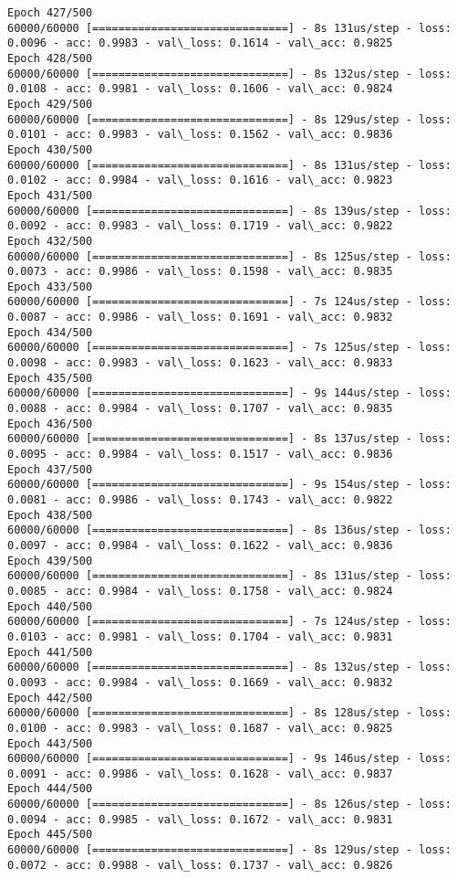 \documentclass[11pt]{article}
\begin{document}
\begin{Verbatim}[commandchars=\\\{\}]
Epoch 427/500
60000/60000 [==============================] - 8s 131us/step - loss: 0.0096 - acc: 0.9983 - val\_loss: 0.1614 - val\_acc: 0.9825
Epoch 428/500
60000/60000 [==============================] - 8s 132us/step - loss: 0.0108 - acc: 0.9981 - val\_loss: 0.1606 - val\_acc: 0.9824
Epoch 429/500
60000/60000 [==============================] - 8s 129us/step - loss: 0.0101 - acc: 0.9983 - val\_loss: 0.1562 - val\_acc: 0.9836
Epoch 430/500
60000/60000 [==============================] - 8s 131us/step - loss: 0.0102 - acc: 0.9984 - val\_loss: 0.1616 - val\_acc: 0.9823
Epoch 431/500
60000/60000 [==============================] - 8s 139us/step - loss: 0.0092 - acc: 0.9983 - val\_loss: 0.1719 - val\_acc: 0.9822
Epoch 432/500
60000/60000 [==============================] - 8s 125us/step - loss: 0.0073 - acc: 0.9986 - val\_loss: 0.1598 - val\_acc: 0.9835
Epoch 433/500
60000/60000 [==============================] - 7s 124us/step - loss: 0.0087 - acc: 0.9986 - val\_loss: 0.1691 - val\_acc: 0.9832
Epoch 434/500
60000/60000 [==============================] - 7s 125us/step - loss: 0.0098 - acc: 0.9983 - val\_loss: 0.1623 - val\_acc: 0.9833
Epoch 435/500
60000/60000 [==============================] - 9s 144us/step - loss: 0.0088 - acc: 0.9984 - val\_loss: 0.1707 - val\_acc: 0.9835
Epoch 436/500
60000/60000 [==============================] - 8s 137us/step - loss: 0.0095 - acc: 0.9984 - val\_loss: 0.1517 - val\_acc: 0.9836
Epoch 437/500
60000/60000 [==============================] - 9s 154us/step - loss: 0.0081 - acc: 0.9986 - val\_loss: 0.1743 - val\_acc: 0.9822
Epoch 438/500
60000/60000 [==============================] - 8s 136us/step - loss: 0.0097 - acc: 0.9984 - val\_loss: 0.1622 - val\_acc: 0.9836
Epoch 439/500
60000/60000 [==============================] - 8s 131us/step - loss: 0.0085 - acc: 0.9984 - val\_loss: 0.1758 - val\_acc: 0.9824
Epoch 440/500
60000/60000 [==============================] - 7s 124us/step - loss: 0.0103 - acc: 0.9981 - val\_loss: 0.1704 - val\_acc: 0.9831
Epoch 441/500
60000/60000 [==============================] - 8s 132us/step - loss: 0.0093 - acc: 0.9984 - val\_loss: 0.1669 - val\_acc: 0.9832
Epoch 442/500
60000/60000 [==============================] - 8s 128us/step - loss: 0.0100 - acc: 0.9983 - val\_loss: 0.1687 - val\_acc: 0.9825
Epoch 443/500
60000/60000 [==============================] - 9s 146us/step - loss: 0.0091 - acc: 0.9986 - val\_loss: 0.1628 - val\_acc: 0.9837
Epoch 444/500
60000/60000 [==============================] - 8s 126us/step - loss: 0.0094 - acc: 0.9985 - val\_loss: 0.1672 - val\_acc: 0.9831
Epoch 445/500
60000/60000 [==============================] - 8s 129us/step - loss: 0.0072 - acc: 0.9988 - val\_loss: 0.1737 - val\_acc: 0.9826

\end{Verbatim}
\end{document}
